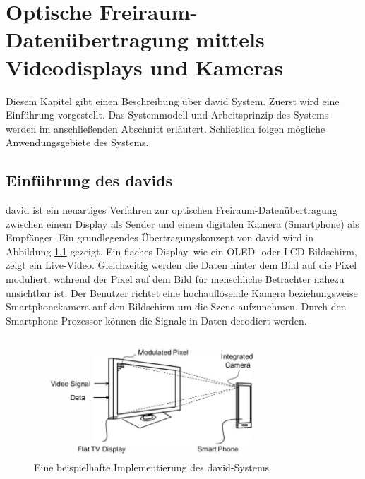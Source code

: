 \chapter{Optische Freiraum-Datenübertragung mittels Videodisplays und Kameras}


Diesem Kapitel gibt einen Beschreibung über \gls{david} System. Zuerst wird eine Einführung vorgestellt. Das Systemmodell und Arbeitsprinzip des Systems werden im anschließenden Abschnitt erläutert. Schließlich folgen mögliche Anwendungsgebiete des Systems. \cite{Kays2017,Kays2016,Kays201501,Kays201502}




\section{Einführung des \gls{david}s} 

\gls{david} ist ein neuartiges Verfahren zur optischen Freiraum-Datenübertragung zwischen einem Display als Sender und einem digitalen Kamera (Smartphone) als Empfänger. Ein grundlegendes Übertragungskonzept von \gls{david} wird in Abbildung \ref{fig:David1} gezeigt. Ein flaches Display, wie ein OLED- oder LCD-Bildschirm, zeigt ein Live-Video. Gleichzeitig werden die Daten hinter dem Bild auf die Pixel moduliert, während der Pixel auf dem Bild für menschliche Betrachter nahezu unsichtbar ist. Der Benutzer richtet eine hochauflösende Kamera beziehungsweise Smartphonekamera auf den Bildschirm um die Szene aufzunehmen. Durch den Smartphone Prozessor können die Signale  in Daten decodiert werden.

\begin{figure}[htb]
 \centering 
 \includegraphics[keepaspectratio,width=0.8\textwidth]{images/2_DaViD/David1.jpg}
 \caption{Eine beispielhafte Implementierung des \gls{david}-Systems}
 \label{fig:David1}
\end{figure}


